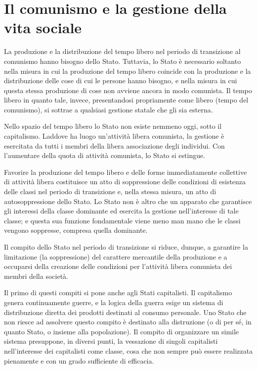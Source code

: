 \documentclass[../main]{subfiles}
\begin{document}
\ifSubfilesClassLoaded{\setcounter{page}{40}}{}
\section{Il comunismo e la gestione della vita sociale}
\label{sec:07_comunismo_gestione}

La produzione e la distribuzione del tempo libero nel periodo di transizione al comunismo hanno bisogno dello Stato. Tuttavia, lo Stato è necessario soltanto nella misura in cui la produzione del tempo libero coincide con la produzione e la distribuzione delle cose di cui le persone hanno bisogno, e nella misura in cui questa stessa produzione di cose non avviene ancora in modo comunista. Il tempo libero in quanto tale, invece, presentandosi propriamente come libero (tempo del comunismo), si sottrae a qualsiasi gestione statale che gli sia esterna.

Nello spazio del tempo libero lo Stato non esiste nemmeno oggi, sotto il capitalismo. Laddove ha luogo un'attività libera comunista, la gestione è esercitata da tutti i membri della libera associazione degli individui. Con l'aumentare della quota di attività comunista, lo Stato si estingue.

Favorire la produzione del tempo libero e delle forme immediatamente collettive di attività libera costituisce un atto di soppressione delle condizioni di esistenza delle classi nel periodo di transizione e, nella stessa misura, un atto di autosoppressione dello Stato. Lo Stato non è altro che un apparato che garantisce gli interessi della classe dominante ed esercita la gestione nell'interesse di tale classe; e questa sua funzione fondamentale viene meno man mano che le classi vengono soppresse, compresa quella dominante.

Il compito dello Stato nel periodo di transizione si riduce, dunque, a garantire la limitazione (la soppressione) del carattere mercantile della produzione e a occuparsi della creazione delle condizioni per l'attività libera comunista dei membri della società.

Il primo di questi compiti si pone anche agli Stati capitalisti. Il capitalismo genera continuamente guerre, e la logica della guerra esige un sistema di distribuzione diretta dei prodotti destinati al consumo personale. Uno Stato che non riesce ad assolvere questo compito è destinato alla distruzione (o di per sé, in quanto Stato, o insieme alla popolazione). Il compito di organizzare un simile sistema presuppone, in diversi punti, la vessazione di singoli capitalisti nell'interesse dei capitalisti come classe, cosa che non sempre può essere realizzata pienamente e con un grado sufficiente di efficacia.
\end{document}
